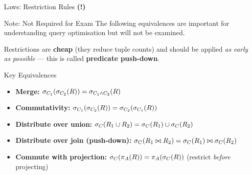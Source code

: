 \begin{frame}{Laws: Restriction Rules \textbf{(!)}}
  \begin{alertblock}{Note: Not Required for Exam}
    The following equivalences are important for understanding query
    optimisation but will not be examined.
  \end{alertblock}

  Restrictions are \textbf{cheap} (they reduce tuple counts) and should be
  applied \emph{as early as possible} --- this is called \textbf{predicate
  push-down}.

  \begin{block}{Key Equivalences}
    \begin{itemize}
      \item \textbf{Merge:}
            $\sigma_{C_1}(\sigma_{C_2}(R)) = \sigma_{C_1 \wedge C_2}(R)$
      \item \textbf{Commutativity:}
            $\sigma_{C_1}(\sigma_{C_2}(R)) = \sigma_{C_2}(\sigma_{C_1}(R))$
      \item \textbf{Distribute over union:}
            $\sigma_C(R_1 \cup R_2) = \sigma_C(R_1) \cup \sigma_C(R_2)$
      \item \textbf{Distribute over join (push-down):}
            $\sigma_C(R_1 \bowtie R_2) = \sigma_C(R_1) \bowtie \sigma_C(R_2)$
      \item \textbf{Commute with projection:}
            $\sigma_C(\pi_A(R)) = \pi_A(\sigma_C(R))$
            \quad (restrict \emph{before} projecting)
    \end{itemize}
  \end{block}
\end{frame}

